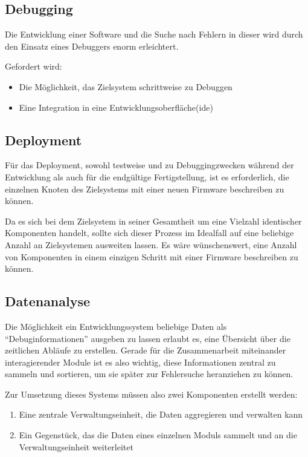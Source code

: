 \subsection{Debugging} Die Entwicklung einer Software und die Suche nach Fehlern
in dieser wird durch den Einsatz eines Debuggers enorm erleichtert. 

\begin{minipage}[c]{\textwidth}
Gefordert wird:
\begin{itemize}
  \item Die Möglichkeit, das Zielsystem schrittweise zu Debuggen
  \item Eine Integration in eine Entwicklungsoberfläche(\gls{ide})
\end{itemize}
\end{minipage}

\subsection{Deployment} Für das Deployment, sowohl testweise und zu
Debuggingzwecken während der Entwicklung als auch für die endgültige
Fertigstellung, ist es erforderlich, die einzelnen Knoten des Zielsystems mit
einer neuen Firmware beschreiben zu können.

Da es sich bei dem Zielsystem in seiner Gesamtheit um eine Vielzahl identischer
Komponenten handelt, sollte sich dieser Prozess im Idealfall auf
eine beliebige Anzahl an Zielsystemen ausweiten lassen. Es wäre wünschenswert,
eine Anzahl von Komponenten in einem einzigen Schritt mit einer Firmware
beschreiben zu können.

\subsection{Datenanalyse} Die Möglichkeit ein Entwicklungssystem beliebige
Daten als "`Debuginformationen"' ausgeben zu lassen erlaubt es, eine
Übersicht über die zeitlichen Abläufe zu erstellen. Gerade für die
Zusammenarbeit miteinander interagierender Module ist es also wichtig, diese
Informationen zentral zu sammeln und sortieren, um sie später zur
Fehlersuche heranziehen zu können.

Zur Umsetzung dieses Systems müssen also zwei Komponenten erstellt werden:
\begin{enumerate}
  \item Eine zentrale Verwaltungseinheit, die Daten aggregieren und verwalten
  kann
  \item Ein Gegenstück, das die Daten eines einzelnen Moduls sammelt und an die
  Verwaltungseinheit weiterleitet
\end{enumerate}


